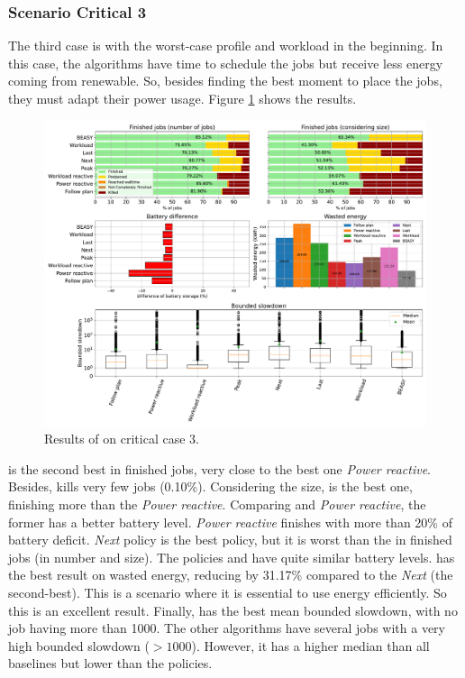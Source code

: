 
\subsubsection{Scenario Critical 3}

The third case is with the worst-case profile and workload in the beginning. In this case, the algorithms have time to schedule the jobs but receive less energy coming from renewable. So, besides finding the best moment to place the jobs, they must adapt their power usage. Figure \ref{fig:beasy_critical_3} shows the results.

\begin{figure}[!htb]
    \centering
    \includegraphics[scale=0.39]{Images/Heuristic/profile_worst_workload_1_with_noise.pdf}
    \caption{Results of \emph{\systemName} on critical case 3.}
    \label{fig:beasy_critical_3}
\end{figure}

\emph{\systemName} is the second best in finished jobs, very close to the best one \emph{Power reactive}. Besides, \emph{\systemName} kills very few jobs (0.10\%). Considering the size, \emph{\systemName} is the best one, finishing more than the \emph{Power reactive}. Comparing \emph{\systemName} and \emph{Power reactive}, the former has a better battery level. \emph{Power reactive} finishes with more than 20\% of battery deficit. \emph{Next} policy is the best policy, but it is worst than the \emph{\systemName} in finished jobs (in number and size). The policies and \emph{\systemName} have quite similar battery levels. \emph{\systemName} has the best result on wasted energy, reducing by 31.17\% compared to the \emph{Next} (the second-best). This is a scenario where it is essential to use energy efficiently. So this is an excellent result. Finally, \emph{\systemName} has the best mean bounded slowdown, with no job having more than 1000. The other algorithms have several jobs with a very high bounded slowdown ($>1000$). However, it has a higher median than all baselines but lower than the policies.

